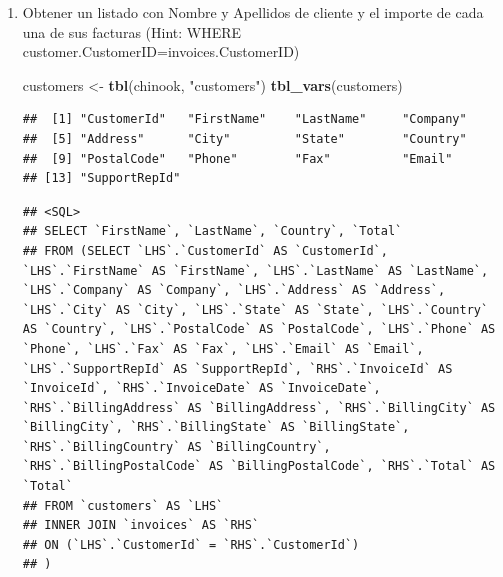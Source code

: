 \documentclass[]{book}
\newenvironment{Shaded}{\begin{snugshade}}{\end{snugshade}}
\newcommand{\KeywordTok}[1]{\textcolor[rgb]{0.13,0.29,0.53}{\textbf{#1}}}
\newcommand{\DataTypeTok}[1]{\textcolor[rgb]{0.13,0.29,0.53}{#1}}
\newcommand{\StringTok}[1]{\textcolor[rgb]{0.31,0.60,0.02}{#1}}
\newcommand{\OperatorTok}[1]{\textcolor[rgb]{0.81,0.36,0.00}{\textbf{#1}}}
\newcommand{\NormalTok}[1]{#1}
\begin{document}
\begin{enumerate}
\def\labelenumi{\arabic{enumi}.}
\setcounter{enumi}{3}
\item
  Obtener un listado con Nombre y Apellidos de cliente y el importe de
  cada una de sus facturas (Hint: WHERE
  customer.CustomerID=invoices.CustomerID)

\begin{Shaded}
\begin{Highlighting}[]
\NormalTok{customers <-}\StringTok{ }\KeywordTok{tbl}\NormalTok{(chinook, }\StringTok{"customers"}\NormalTok{)}
\KeywordTok{tbl_vars}\NormalTok{(customers) }
\end{Highlighting}
\end{Shaded}

\begin{verbatim}
##  [1] "CustomerId"   "FirstName"    "LastName"     "Company"     
##  [5] "Address"      "City"         "State"        "Country"     
##  [9] "PostalCode"   "Phone"        "Fax"          "Email"       
## [13] "SupportRepId"
\end{verbatim}

\begin{Shaded}
\end{Shaded}

\begin{verbatim}
## <SQL>
## SELECT `FirstName`, `LastName`, `Country`, `Total`
## FROM (SELECT `LHS`.`CustomerId` AS `CustomerId`, `LHS`.`FirstName` AS `FirstName`, `LHS`.`LastName` AS `LastName`, `LHS`.`Company` AS `Company`, `LHS`.`Address` AS `Address`, `LHS`.`City` AS `City`, `LHS`.`State` AS `State`, `LHS`.`Country` AS `Country`, `LHS`.`PostalCode` AS `PostalCode`, `LHS`.`Phone` AS `Phone`, `LHS`.`Fax` AS `Fax`, `LHS`.`Email` AS `Email`, `LHS`.`SupportRepId` AS `SupportRepId`, `RHS`.`InvoiceId` AS `InvoiceId`, `RHS`.`InvoiceDate` AS `InvoiceDate`, `RHS`.`BillingAddress` AS `BillingAddress`, `RHS`.`BillingCity` AS `BillingCity`, `RHS`.`BillingState` AS `BillingState`, `RHS`.`BillingCountry` AS `BillingCountry`, `RHS`.`BillingPostalCode` AS `BillingPostalCode`, `RHS`.`Total` AS `Total`
## FROM `customers` AS `LHS`
## INNER JOIN `invoices` AS `RHS`
## ON (`LHS`.`CustomerId` = `RHS`.`CustomerId`)
## )
\end{verbatim}


\end{enumerate}
\end{document}
